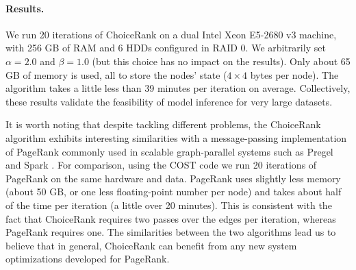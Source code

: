 \paragraph{Results.}
We run \num{20} iterations of ChoiceRank on a dual Intel Xeon E5-2680 v3 machine, with \num{256} GB of RAM and \num{6} HDDs configured in RAID 0.
We arbitrarily set $\alpha = 2.0$ and $\beta = 1.0$ (but this choice has no impact on the results).
Only about \num{65} GB of memory is used, all to store the nodes' state ($4 \times 4$ bytes per node).
The algorithm takes a little less than \num{39} minutes per iteration on average.
Collectively, these results validate the feasibility of model inference for very large datasets.

It is worth noting that despite tackling different problems, the ChoiceRank algorithm exhibits interesting similarities with a message-passing implementation of PageRank commonly used in scalable graph-parallel systems such as Pregel \citep{malewicz2010pregel} and Spark \citep{gonzalez2014graphx}.
For comparison, using the COST code \citep{mcsherry2015scalability} we run \num{20} iterations of PageRank on the same hardware and data.
PageRank uses slightly less memory (about \num{50} GB, or one less floating-point number per node) and takes about half of the time per iteration (a little over \num{20} minutes).
This is consistent with the fact that ChoiceRank requires two passes over the edges per iteration, whereas PageRank requires one.
The similarities between the two algorithms lead us to believe that in general, ChoiceRank can benefit from any new system optimizations developed for PageRank.
